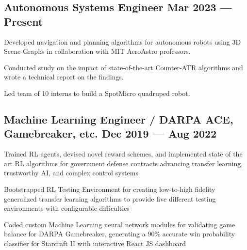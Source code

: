 \subsection{{Autonomous Systems Engineer \hfill Mar 2023 --- Present}}
\begin{zitemize}
	\item Developed navigation and planning algorithms for autonomous robots using 3D Scene-Graphs in collaboration with MIT AeroAstro professors.
	\item Conducted study on the impact of state-of-the-art Counter-ATR algorithms and wrote a technical report on the findings.
	\item Led team of 10 interns to build a SpotMicro quadruped robot.
\end{zitemize}

\subsection{{Machine Learning Engineer / DARPA ACE, Gamebreaker, etc. \hfill Dec 2019 --- Aug 2022}}
\begin{zitemize}
	\item Trained RL agents, devised novel reward schemes, and implemented state of the art RL algorithms for government defense contracts advancing transfer learning, trustworthy AI, and complex
	control systems
	\item Bootstrapped RL Testing Environment for creating low-to-high fidelity generalized transfer learning algorithms
	to provide five different testing environments with configurable difficulties
	\item Coded custom Machine Learning neural network modules for validating game balance for DARPA Gamebreaker, generating a 90\%
	accurate win probability classifier for Starcraft II with interactive React JS dashboard
\end{zitemize}

